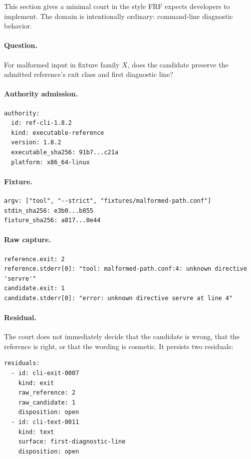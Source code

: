 \documentclass[11pt,a4paper]{article}
\newcommand{\frf}{\textsc{FRF}}
\begin{document}
This section gives a minimal court in the style \frf{} expects developers to implement. The domain is intentionally ordinary: command-line diagnostic behavior.

\paragraph{Question.}
For malformed input in fixture family \(X\), does the candidate preserve the admitted reference's exit class and first diagnostic line?

\paragraph{Authority admission.}
\begin{verbatim}
authority:
  id: ref-cli-1.8.2
  kind: executable-reference
  version: 1.8.2
  executable_sha256: 91b7...c21a
  platform: x86_64-linux
\end{verbatim}

\paragraph{Fixture.}
\begin{verbatim}
argv: ["tool", "--strict", "fixtures/malformed-path.conf"]
stdin_sha256: e3b0...b855
fixture_sha256: a817...0e44
\end{verbatim}

\paragraph{Raw capture.}
\begin{verbatim}
reference.exit: 2
reference.stderr[0]: "tool: malformed-path.conf:4: unknown directive 'servre'"
candidate.exit: 1
candidate.stderr[0]: "error: unknown directive servre at line 4"
\end{verbatim}

\paragraph{Residual.}
The court does not immediately decide that the candidate is wrong, that the reference is right, or that the wording is cosmetic. It persists two residuals:
\begin{verbatim}
residuals:
  - id: cli-exit-0007
    kind: exit
    raw_reference: 2
    raw_candidate: 1
    disposition: open
  - id: cli-text-0011
    kind: text
    surface: first-diagnostic-line
    disposition: open
\end{verbatim}
\end{document}
